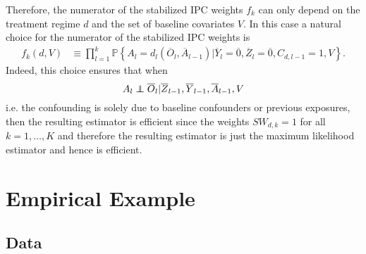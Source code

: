 \documentclass[12pt]{article}
\begin{document}
Therefore, the numerator of the stabilized IPC weights $f_{k}$ can only depend on the treatment regime $d$ and the set of baseline covariates $V$. In this case a natural choice for the numerator of the stabilized IPC weights is 
\begin{align*}
f_{k} \left( d, V \right) &\equiv \prod_{l=1}^{k} \mathbb{P} \left\lbrace A_{l} = d_l \left( \overline{O}_{l}, \overline{A}_{l-1} \right) \vert \overline{Y}_{l} = \overline{0}, \overline{Z}_{l} = \overline{0}, C_{d,l-1} = 1, V \right\rbrace.
\end{align*}
Indeed, this choice ensures that when
\begin{equation*}
A_l \perp\!\!\!\!\perp \overline{O}_l \vert \overline{Z}_{l-1}, \overline{Y}_{l-1}, \overline{A}_{l-1}, V
\end{equation*}
i.e. the confounding is solely due to baseline confounders or previous exposures, then the resulting estimator is efficient since the weights $SW_{d,k} = 1$ for all $k = 1, \dots, K$ and therefore the resulting estimator is just the maximum likelihood estimator and hence is efficient.

\section{Empirical Example}\label{sec5}

\subsection{Data}
\end{document}
